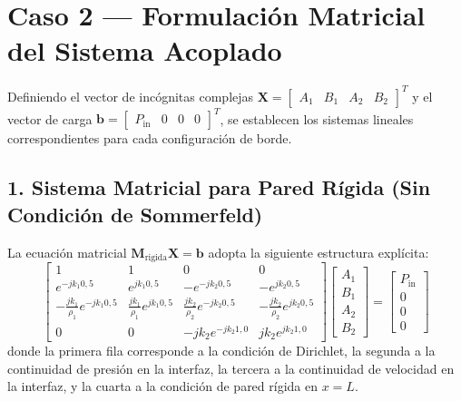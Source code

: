 \documentclass[11pt,letterpaper]{article}
\begin{document}
\section{Caso 2 --- Formulación Matricial del Sistema Acoplado}

Definiendo el vector de incógnitas complejas $\mathbf{X} = \begin{bmatrix} A_1 & B_1 & A_2 & B_2 \end{bmatrix}^T$ y el vector de carga $\mathbf{b} = \begin{bmatrix} P_{\text{in}} & 0 & 0 & 0 \end{bmatrix}^T$, se establecen los sistemas lineales correspondientes para cada configuración de borde.

\subsection{1. Sistema Matricial para Pared Rígida (Sin Condición de Sommerfeld)}

La ecuación matricial $\mathbf{M}_{\text{rigida}} \mathbf{X} = \mathbf{b}$ adopta la siguiente estructura explícita:
\begin{equation}
\begin{bmatrix}
    1 & 1 & 0 & 0 \\
    e^{-j k_1 0{,}5} & e^{j k_1 0{,}5} & -e^{-j k_2 0{,}5} & -e^{j k_2 0{,}5} \\
    -\frac{j k_1}{\rho_1} e^{-j k_1 0{,}5} & \frac{j k_1}{\rho_1} e^{j k_1 0{,}5} & \frac{j k_2}{\rho_2} e^{-j k_2 0{,}5} & -\frac{j k_2}{\rho_2} e^{j k_2 0{,}5} \\
    0 & 0 & -j k_2 e^{-j k_2 1{,}0} & j k_2 e^{j k_2 1{,}0}
\end{bmatrix}
\begin{bmatrix}
    A_1 \\ B_1 \\ A_2 \\ B_2
\end{bmatrix}
=
\begin{bmatrix}
    P_{\text{in}} \\ 0 \\ 0 \\ 0
\end{bmatrix}
\end{equation}
donde la primera fila corresponde a la condición de Dirichlet, la segunda a la continuidad de presión en la interfaz, la tercera a la continuidad de velocidad en la interfaz, y la cuarta a la condición de pared rígida en $x=L$.
\end{document}
